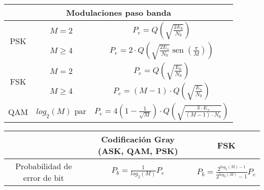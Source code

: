 \documentclass[es]{article}
\DeclareMathOperator{\sen}{sen}
\begin{document}
\begin{center}
    \renewcommand{\arraystretch}{2.2}
        \begin{tabular}{|c|c|c|}
            \multicolumn{3}{c}{{\bf Modulaciones paso banda}}\\
            \hline
            \multirow{2}{*}{PSK} & $M=2$ & $P_e = Q\left ( \displaystyle\sqrt{\displaystyle\frac{2 E_b}{N_0}} \right)$ \\[1ex]
            \cline{2-3}
            & $M \geq 4$ & $P_e = 2 \cdot Q\left ( \sqrt{\displaystyle\frac{2 E_s}{N_0}} \sen\left ( \displaystyle\frac{\pi}{M} \right)  \right)$ \\
            \hline
            \multirow{2}{*}{FSK} & $M=2$ & $P_e = Q\left ( \sqrt{\displaystyle\frac{E_b}{N_0}} \right)$ \\
            \cline{2-3}
            & $M\geq 4$ & $P_e = (M-1) \cdot Q\left ( \sqrt{\displaystyle\frac{E_s}{N_0}} \right)$ \\
            \hline
            QAM & $log_2(M)$ par & $P_e = 4 \left ( 1 - \displaystyle\frac{1}{\sqrt{M}} \right ) \cdot Q\left ( \sqrt{\displaystyle\frac{3 \cdot E_s}{(M-1) \cdot N_0}} \right)$ \\
            \hline
        \end{tabular}
        \renewcommand{\arraystretch}{1}
        \vspace{0.5cm}



    
        \renewcommand{\arraystretch}{1.5}
        \begin{tabular}{|c|c|c|}
            \hline
            & Codificación Gray (ASK, QAM, PSK) & FSK \\ 
            \hline
            Probabilidad de error de bit & $P_b = \displaystyle\frac{1}{log_2(M)} P_e$ & $P_b = \displaystyle\frac{2^{log_2(M)-1}}{2^{log_2(M)}-1} P_e$ \\
            \hline
        \end{tabular}
        \renewcommand{\arraystretch}{1} 
        \vspace{0.5cm}
    

\end{center}
\end{document}
